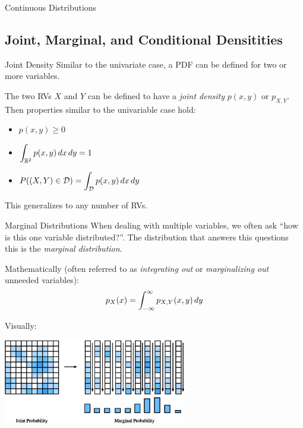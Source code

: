 {\begin{frame}{Continuous Distributions}
    \end{frame}

    \subsection{Joint, Marginal, and Conditional Densitities}

    \begin{frame}{Joint Density}
        Similar to the univariate case, a PDF can be defined for two or more variables.

        The two RVs $X$ and $Y$ can be defined to have a \emph{joint density} $p(x, y)$ or $p_{X, Y}$.
        Then properties similar to the univariable case hold:
        \begin{itemize}
            \item $\displaystyle p(x, y) \ge 0$
            \item $\displaystyle \int _ {\mathbb{R}^2} p(x, y) \mathop{dx} \mathop{dy} = 1$
            \item $\displaystyle P((X, Y) \in \mathcal{D}) = \int _ {\mathcal{D}} p(x, y) \mathop{dx} \mathop{dy}$
        \end{itemize}

        This generalizes to any number of RVs.
    \end{frame}

    \begin{frame}{Marginal Distributions}
        When dealing with multiple variables, we often ask ``how is this one variable distributed?''.
        The distribution that answers this questions this is the \emph{marginal distribution}.

        Mathematically (often referred to as \emph{integrating out} or \emph{marginalizing out} unneeded variables):
        $$p _ X(x) = \int_{-\infty}^\infty p_{X, Y}(x, y) \mathop{dy}$$

        Visually:
        \begin{center}
            \includegraphics[width=0.6\textwidth]{fig/prob_marginal_distr.eps}
        \end{center}
    \end{frame}

}
